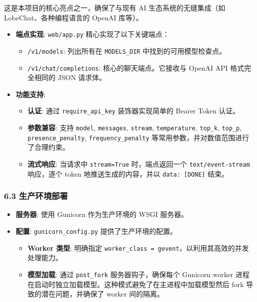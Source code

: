 \documentclass[a4paper]{article}
\providecommand{\tightlist}{%
  \setlength{\itemsep}{0pt}\setlength{\parskip}{0pt}}
\begin{document}
这是本项目的核心亮点之一，确保了与现有 AI 生态系统的无缝集成（如
LobeChat、各种编程语言的 OpenAI 库等）。

\begin{itemize}
\tightlist
\item
  \textbf{端点实现}: \texttt{web/app.py} 精心实现了以下关键端点：

  \begin{itemize}
  \tightlist
  \item
    \texttt{/v1/models}: 列出所有在 \texttt{MODELS\_DIR}
    中找到的可用模型检查点。
  \item
    \texttt{/v1/chat/completions}: 核心的聊天端点。它接收与 OpenAI API
    格式完全相同的 JSON 请求体。
  \end{itemize}
\item
  \textbf{功能支持}:

  \begin{itemize}
  \tightlist
  \item
    \textbf{认证}: 通过 \texttt{require\_api\_key} 装饰器实现简单的
    Bearer Token 认证。
  \item
    \textbf{参数兼容}: 支持 \texttt{model}, \texttt{messages},
    \texttt{stream}, \texttt{temperature}, \texttt{top\_k},
    \texttt{top\_p}, \texttt{presence\_penalty},
    \texttt{frequency\_penalty} 等常用参数，并对数值范围进行了合理约束。
  \item
    \textbf{流式响应}: 当请求中 \texttt{stream=True} 时，端点返回一个
    \texttt{text/event-stream} 响应，逐个 token 地推送生成的内容，并以
    \texttt{data:\ {[}DONE{]}} 结束。
  \end{itemize}
\end{itemize}

\subsubsection{6.3
生产环境部署}\label{ux751fux4ea7ux73afux5883ux90e8ux7f72}

\begin{itemize}
\tightlist
\item
  \textbf{服务器}: 使用 Gunicorn 作为生产环境的 WSGI 服务器。
\item
  \textbf{配置}: \texttt{gunicorn\_config.py} 提供了生产环境的配置。

  \begin{itemize}
  \tightlist
  \item
    \textbf{Worker 类型}: 明确指定
    \texttt{worker\_class\ =\ \textquotesingle{}gevent\textquotesingle{}}，以利用其高效的并发处理能力。
  \item
    \textbf{模型加载}: 通过 \texttt{post\_fork} 服务器钩子，确保每个
    Gunicorn worker
    进程在启动时独立加载模型。这种模式避免了在主进程中加载模型然后 fork
    导致的潜在问题，并确保了 worker 间的隔离。
  \end{itemize}
\end{itemize}
\end{document}
